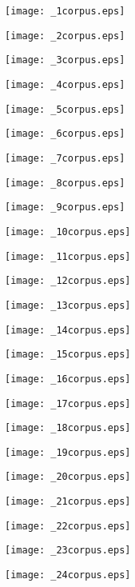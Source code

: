 \documentclass{article}
\begin{document}
\texttt{[image: \_1corpus.eps]}

\texttt{[image: \_2corpus.eps]}

\texttt{[image: \_3corpus.eps]}

\texttt{[image: \_4corpus.eps]}

\texttt{[image: \_5corpus.eps]}

\texttt{[image: \_6corpus.eps]}

\texttt{[image: \_7corpus.eps]}

\texttt{[image: \_8corpus.eps]}

\texttt{[image: \_9corpus.eps]}

\texttt{[image: \_10corpus.eps]}

\texttt{[image: \_11corpus.eps]}

\texttt{[image: \_12corpus.eps]}

\texttt{[image: \_13corpus.eps]}

\texttt{[image: \_14corpus.eps]}

\texttt{[image: \_15corpus.eps]}

\texttt{[image: \_16corpus.eps]}

\texttt{[image: \_17corpus.eps]}

\texttt{[image: \_18corpus.eps]}

\texttt{[image: \_19corpus.eps]}

\texttt{[image: \_20corpus.eps]}

\texttt{[image: \_21corpus.eps]}

\texttt{[image: \_22corpus.eps]}

\texttt{[image: \_23corpus.eps]}

\texttt{[image: \_24corpus.eps]}
\end{document}
